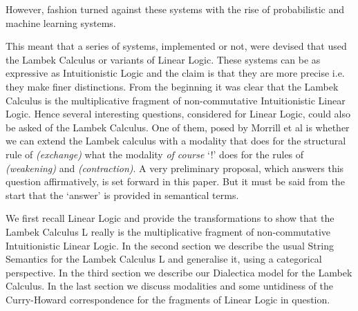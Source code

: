 \documentclass{article}
\begin{document}
However, fashion turned against these systems with the rise of probabilistic and machine learning systems.

This meant that a series of systems, implemented or not, were devised  that used the Lambek Calculus or variants of Linear Logic. These systems can be   as expressive as Intuitionistic Logic and the claim is that they are more precise i.e. they make finer distinctions.
From the beginning it was clear that the Lambek Calculus is the multiplicative fragment of non-commutative Intuitionistic Linear Logic. 
Hence several interesting questions, considered for Linear Logic,  could also be asked of the Lambek Calculus. 
One of them, posed by Morrill et al  is whether we can extend the Lambek calculus with a modality that does for the structural rule of \textit{(exchange)} what the modality \textit{of course} `!' does for the rules of \textit{(weakening)} and \textit{(contraction)}.
A very preliminary proposal, which answers this question affirmatively, is set forward in this paper. But it must be said from the start that the `answer' is  provided in semantical terms. 


We first recall Linear Logic and provide the transformations to show that the Lambek Calculus \textsf{L} really is the multiplicative fragment of non-commutative Intuitionistic Linear Logic. 
In the second section we describe the usual String Semantics for the Lambek Calculus \textsf{L} and generalise it, using a categorical perspective. 
In the third section we describe our Dialectica model for the Lambek Calculus. 
In the last section we discuss modalities and some untidiness of the Curry-Howard correspondence for the fragments of Linear Logic in question.

\iffalse
\noindent{\textbf{Acknowledgments}} I would like to thank Jan van Eijck for inviting me to give the talk that became
this note, thereby gently `forcing' me to think about the subject, as well as for his
generous hospitality. I also would like to thank Martin Hyland, Harold Schellinx,
Dirk Roorda, Mark Hepple, Glyn Morrill and Michael Moortgat for several useful
discussions. Many of the ideas in this paper have been shaped by these discussions,
but of course the mistakes are all mine. Finally I want to thank Jim Lambek for     `putting me right'
 in the most friendly possible way on how completeness has nothing to do with the existence of two disjunctions.
\fi 
\end{document}
